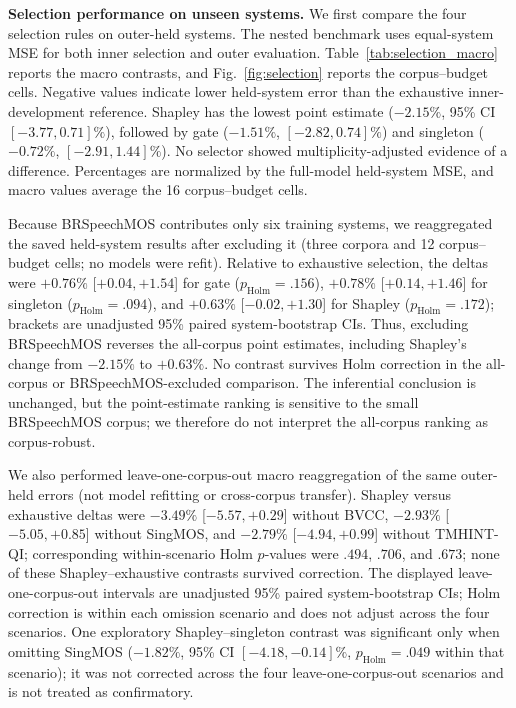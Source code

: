 \documentclass{article}
\begin{document}
\textbf{Selection performance on unseen systems.}
We first compare the four selection rules on outer-held systems. The nested
benchmark uses equal-system MSE for both inner selection and outer evaluation.
Table~\ref{tab:selection_macro} reports the macro contrasts, and
Fig.~\ref{fig:selection} reports the corpus--budget cells. Negative values
indicate lower held-system error than the exhaustive inner-development
reference. Shapley has the lowest point estimate ($-2.15\%$, 95\% CI
$[-3.77,0.71]\%$), followed by gate ($-1.51\%$, $[-2.82,0.74]\%$) and
singleton ($-0.72\%$, $[-2.91,1.44]\%$). No selector showed
multiplicity-adjusted evidence of a difference. Percentages are normalized by
the full-model held-system MSE, and macro values average the 16
 corpus--budget cells.

Because BRSpeechMOS contributes only six training systems, we reaggregated the
saved held-system results after excluding it (three corpora and 12
corpus--budget cells; no models were refit).
Relative to exhaustive selection, the deltas were $+0.76\%$
[$+0.04,+1.54$] for gate ($p_{\mathrm{Holm}}=.156$), $+0.78\%$
[$+0.14,+1.46$] for singleton ($p_{\mathrm{Holm}}=.094$), and $+0.63\%$
[$-0.02,+1.30$] for Shapley ($p_{\mathrm{Holm}}=.172$); brackets are
unadjusted 95\% paired system-bootstrap CIs. Thus, excluding BRSpeechMOS
reverses the all-corpus point estimates, including Shapley's change from
$-2.15\%$ to $+0.63\%$. No contrast survives Holm correction in the
all-corpus or BRSpeechMOS-excluded comparison. The inferential conclusion is
unchanged, but the point-estimate
ranking is sensitive to the small BRSpeechMOS corpus; we therefore do not
interpret the all-corpus ranking as corpus-robust.

We also performed leave-one-corpus-out macro reaggregation of the same
outer-held errors (not model refitting or cross-corpus transfer). Shapley
versus exhaustive deltas were $-3.49\%$ [$-5.57,+0.29$] without BVCC,
$-2.93\%$ [$-5.05,+0.85$] without SingMOS, and $-2.79\%$
[$-4.94,+0.99$] without TMHINT-QI; corresponding within-scenario Holm
$p$-values were $.494$, $.706$, and $.673$; none of these Shapley--exhaustive
contrasts survived correction. The displayed leave-one-corpus-out intervals
are unadjusted 95\% paired system-bootstrap CIs; Holm correction is within
each omission scenario and does not adjust across the four scenarios.
One exploratory Shapley--singleton contrast was significant only when omitting
SingMOS ($-1.82\%$, 95\% CI $[-4.18,-0.14]\%$,
$p_{\mathrm{Holm}}=.049$ within that scenario); it was not corrected across
the four leave-one-corpus-out scenarios and is not treated as confirmatory.
\end{document}
